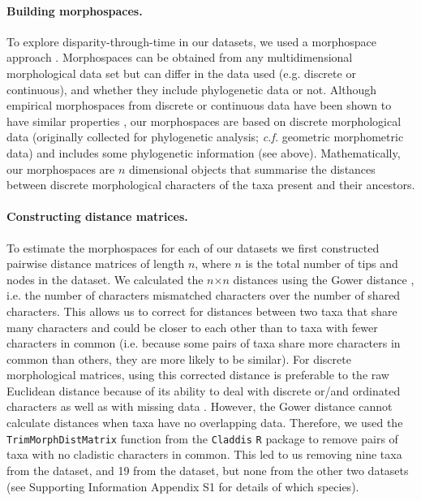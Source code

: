 \documentclass[12pt,a4paper]{article}
\begin{document}
\paragraph{Building morphospaces.} 
To explore disparity-through-time in our datasets, we used a morphospace approach \citep[e.g.][]{Foote01071994,Foote29111996,Wesley-Hunt2005,Brusatte12092008,friedmanexplosive2010,toljagictriassic-jurassic2013,Hughes20082013}.
Morphospaces can be obtained from any multidimensional morphological data set but can differ in the data used (e.g. discrete or continuous), and whether they include phylogenetic data or not.
Although empirical morphospaces from discrete or continuous data have been shown to have similar properties \citep{foth2012different,hetherington2015cladistic}, our morphospaces are based on discrete morphological data (originally collected for phylogenetic analysis; \textit{c.f.} geometric morphometric data) and includes some phylogenetic information (see above).
Mathematically, our morphospaces are $n$ dimensional objects that summarise the distances between discrete morphological characters of the taxa present and their ancestors.

\paragraph{Constructing distance matrices.}
To estimate the morphospaces for each of our datasets we first constructed pairwise distance matrices of length $n$, where $n$ is the total number of tips and nodes in the dataset.
We calculated the $n$$\times$$n$ distances using the Gower distance \citep{Gower71}, i.e. the number of characters mismatched characters over the number of shared characters.
This allows us to correct for distances between two taxa that share many characters and could be closer to each other than to taxa with fewer characters in common (i.e. because some pairs of taxa share more characters in common than others, they are more likely to be similar).
For discrete morphological matrices, using this corrected distance is preferable to the raw Euclidean distance because of its ability to deal with discrete or/and ordinated characters as well as with missing data \citep{anderson2012using}.
However, the Gower distance cannot calculate distances when taxa have no overlapping data.
Therefore, we used the \texttt{TrimMorphDistMatrix} function from the \texttt{Claddis} \texttt{R} package to remove pairs of taxa with no cladistic characters in common.
This led to us removing nine taxa from the \cite{bapst2016topology} dataset, and 19 from the \cite{brusatte2014gradual} dataset, but none from the other two datasets (see Supporting Information Appendix S1 for details of which species). 
\end{document}
